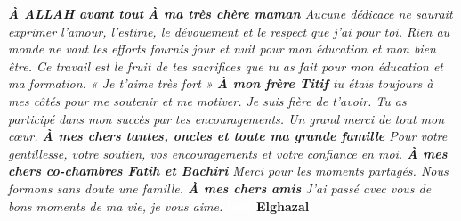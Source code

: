 \thispagestyle{plain}
\begin{large}
\begin{center}
\centering

\noindent\textit{
    \textbf{À ALLAH avant tout}
    \newline
    \textbf{À ma très chère maman}
    \newline
    Aucune dédicace ne saurait exprimer l'amour, l'estime, le dévouement et le
    respect que j'ai pour toi.
    \newline
    Rien au monde ne vaut les efforts fournis jour et nuit pour mon éducation et
    mon bien être.
    \newline
    Ce travail est le fruit de tes sacrifices que tu as fait pour mon éducation et ma formation.
    « Je t'aime très fort »
    \newline
    \newline
    \textbf{À mon frère Titif}
    \newline
    tu étais toujours à mes côtés pour me soutenir et me motiver. Je suis fière de t'avoir.
    \newline
    Tu as participé dans mon succès par tes encouragements. Un grand merci de tout mon cœur.
    \newline
    \newline
    \newline
    \textbf{À mes chers tantes, oncles et toute ma grande famille}
    \newline
    Pour votre gentillesse, votre soutien, vos encouragements et votre confiance en moi.
    \newline
    \newline
    \textbf{À mes chers co-chambres Fatih et Bachiri}
    \newline
    Merci pour les moments partagés. Nous formons sans doute une famille. 
    \newline
    \newline
    \textbf{À mes chers amis}
    \newline
    J'ai passé avec vous de bons moments de ma vie, je vous aime.
    \newline
    \newline
}
\newline
\raggedleft\textbf{\textcolor{white}{text}}
\hfill \textbf{Elghazal}
\end{center}
\end{large}